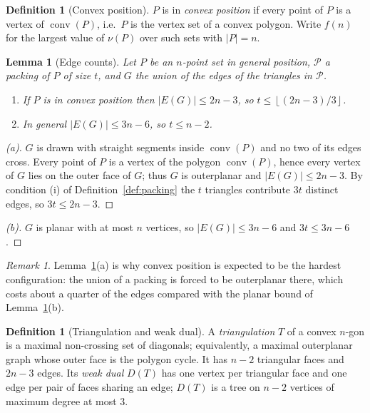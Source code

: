 \documentclass[11pt]{article}
\theoremstyle{plain}
\newtheorem{lemma}[theorem]{Lemma}
\theoremstyle{definition}
\newtheorem{definition}[theorem]{Definition}
\theoremstyle{remark}
\newtheorem{remark}[theorem]{Remark}
\newcommand{\Floor}[1]{\left\lfloor #1\right\rfloor}
\newcommand{\pack}{\mathcal{P}}
\begin{document}
\begin{definition}[Convex position]\label{def:convexpos}
$P$ is in \emph{convex position} if every point of $P$ is a vertex of $\operatorname{conv}(P)$,
i.e.\ $P$ is the vertex set of a convex polygon.  Write $f(n)$ for the largest value of
$\nu(P)$ over such sets with $|P|=n$.
\end{definition}

\begin{lemma}[Edge counts]\label{lem:edges}
Let $P$ be an $n$-point set in general position, $\pack$ a packing of $P$ of size $t$, and
$G$ the union of the edges of the triangles in $\pack$.
\begin{enumerate}[label=(\alph*)]
\item[(a)] If $P$ is in convex position then $|E(G)|\le 2n-3$, so
      $t\le\Floor{(2n-3)/3}$.
\item[(b)] In general $|E(G)|\le 3n-6$, so $t\le n-2$.
\end{enumerate}
\end{lemma}

\begin{proof}[(a)]
$G$ is drawn with straight segments inside $\operatorname{conv}(P)$ and no two of its edges
cross.  Every point of $P$ is a vertex of the polygon $\operatorname{conv}(P)$, hence every
vertex of $G$ lies on the outer face of $G$; thus $G$ is outerplanar and $|E(G)|\le 2n-3$.
By condition (i) of Definition~\ref{def:packing} the $t$ triangles contribute $3t$
distinct edges, so $3t\le 2n-3$.
\end{proof}

\begin{proof}[(b)]
$G$ is planar with at most $n$ vertices, so $|E(G)|\le 3n-6$ and $3t\le 3n-6$.
\end{proof}

\begin{remark}\label{rem:outerplanar}
Lemma~\ref{lem:edges}(a) is why convex position is expected to be the hardest
configuration: the union of a packing is forced to be outerplanar there, which costs about
a quarter of the edges compared with the planar bound of Lemma~\ref{lem:edges}(b).
\end{remark}

\begin{definition}[Triangulation and weak dual]\label{def:tri}
A \emph{triangulation} $T$ of a convex $n$-gon is a maximal non-crossing set of
diagonals; equivalently, a maximal outerplanar graph whose outer face is the polygon cycle.
It has $n-2$ triangular faces and $2n-3$ edges.  Its \emph{weak dual} $D(T)$ has one
vertex per triangular face and one edge per pair of faces sharing an edge; $D(T)$ is a tree
on $n-2$ vertices of maximum degree at most $3$.
\end{definition}
\end{document}

